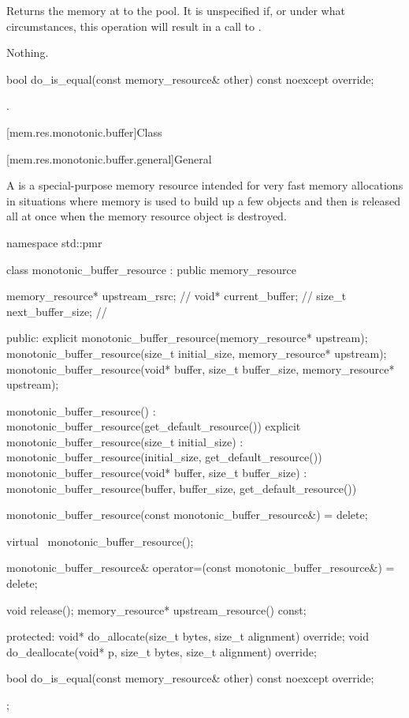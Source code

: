 \begin{itemdescr}
\pnum
\effects
Returns the memory at  to the pool.
It is unspecified if, or under what circumstances,
this operation will result in a call to .

\pnum
\throws
Nothing.
\end{itemdescr}

%
%
\begin{itemdecl}
bool do_is_equal(const memory_resource& other) const noexcept override;
\end{itemdecl}

\begin{itemdescr}
\pnum
\returns
{}.
\end{itemdescr}

[mem.res.monotonic.buffer]{Class }

[mem.res.monotonic.buffer.general]{General}

\pnum
A  is a special-purpose memory resource
intended for very fast memory allocations in situations
where memory is used to build up a few objects
and then is released all at once when the memory resource object is destroyed.

%
\begin{codeblock}
namespace std::pmr {
  class monotonic_buffer_resource : public memory_resource {
    memory_resource* upstream_rsrc;     // \expos
    void* current_buffer;               // \expos
    size_t next_buffer_size;            // \expos

  public:
    explicit monotonic_buffer_resource(memory_resource* upstream);
    monotonic_buffer_resource(size_t initial_size, memory_resource* upstream);
    monotonic_buffer_resource(void* buffer, size_t buffer_size, memory_resource* upstream);

    monotonic_buffer_resource()
      : monotonic_buffer_resource(get_default_resource()) {}
    explicit monotonic_buffer_resource(size_t initial_size)
      : monotonic_buffer_resource(initial_size, get_default_resource()) {}
    monotonic_buffer_resource(void* buffer, size_t buffer_size)
      : monotonic_buffer_resource(buffer, buffer_size, get_default_resource()) {}

    monotonic_buffer_resource(const monotonic_buffer_resource&) = delete;

    virtual ~monotonic_buffer_resource();

    monotonic_buffer_resource& operator=(const monotonic_buffer_resource&) = delete;

    void release();
    memory_resource* upstream_resource() const;

  protected:
    void* do_allocate(size_t bytes, size_t alignment) override;
    void do_deallocate(void* p, size_t bytes, size_t alignment) override;

    bool do_is_equal(const memory_resource& other) const noexcept override;
  };
}
\end{codeblock}

